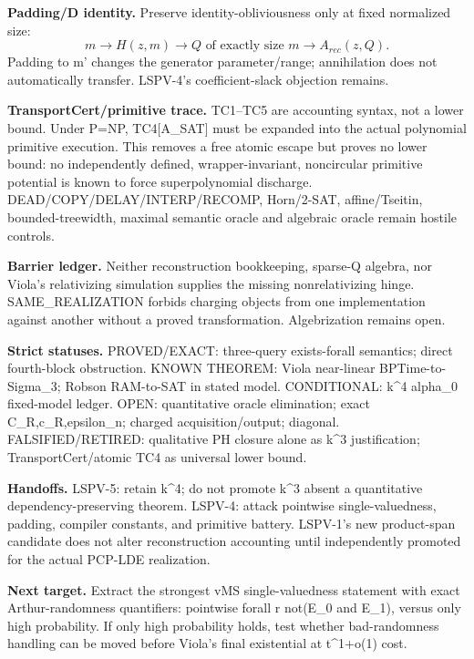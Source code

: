 \documentclass{article}
\begin{document}
\textbf{Padding/D identity.} Preserve identity-obliviousness only at fixed normalized size:
\[
m\to H(z,m)\to Q\text{ of exactly size }m\to A_{rec}(z,Q).
\]
Padding to m' changes the generator parameter/range; annihilation does not automatically transfer. LSPV-4's coefficient-slack objection remains.

\textbf{TransportCert/primitive trace.} TC1--TC5 are accounting syntax, not a lower bound. Under P=NP, TC4[A_SAT] must be expanded into the actual polynomial primitive execution. This removes a free atomic escape but proves no lower bound: no independently defined, wrapper-invariant, noncircular primitive potential is known to force superpolynomial discharge. DEAD/COPY/DELAY/INTERP/RECOMP, Horn/2-SAT, affine/Tseitin, bounded-treewidth, maximal semantic oracle and algebraic oracle remain hostile controls.

\textbf{Barrier ledger.} Neither reconstruction bookkeeping, sparse-Q algebra, nor Viola's relativizing simulation supplies the missing nonrelativizing hinge. SAME_REALIZATION forbids charging objects from one implementation against another without a proved transformation. Algebrization remains open.

\textbf{Strict statuses.}
PROVED/EXACT: three-query exists-forall semantics; direct fourth-block obstruction.
KNOWN THEOREM: Viola near-linear BPTime-to-Sigma_3; Robson RAM-to-SAT in stated model.
CONDITIONAL: k^4 alpha_0 fixed-model ledger.
OPEN: quantitative oracle elimination; exact C_R,c_R,epsilon_n; charged acquisition/output; diagonal.
FALSIFIED/RETIRED: qualitative PH closure alone as k^3 justification; TransportCert/atomic TC4 as universal lower bound.

\textbf{Handoffs.} LSPV-5: retain k^4; do not promote k^3 absent a quantitative dependency-preserving theorem. LSPV-4: attack pointwise single-valuedness, padding, compiler constants, and primitive battery. LSPV-1's new product-span candidate does not alter reconstruction accounting until independently promoted for the actual PCP-LDE realization.

\textbf{Next target.} Extract the strongest vMS single-valuedness statement with exact Arthur-randomness quantifiers: pointwise forall r not(E_0 and E_1), versus only high probability. If only high probability holds, test whether bad-randomness handling can be moved before Viola's final existential at t^{1+o(1)} cost.
\end{document}
